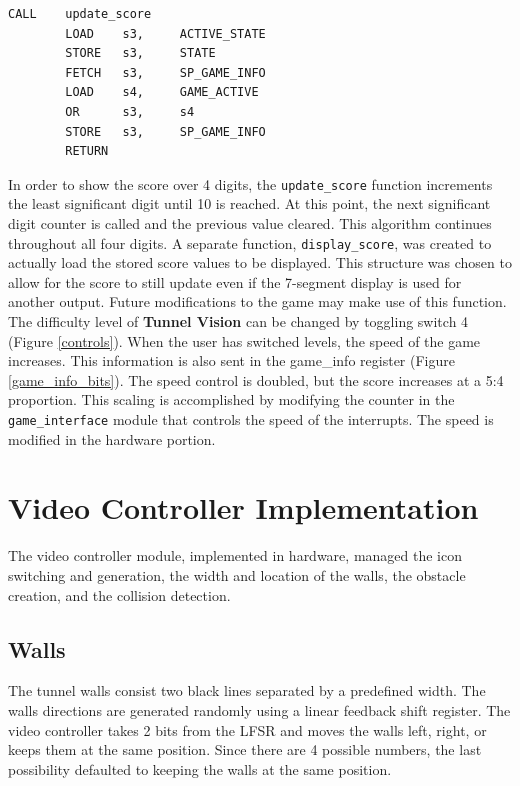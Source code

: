 \documentclass[11pt]{article}
\begin{document}
\vspace{12pt}

\begin{lstlisting}[caption=Update the state game info, label=active]		
		CALL	update_score				
		LOAD 	s3,		ACTIVE_STATE
		STORE	s3,		STATE
		FETCH	s3,		SP_GAME_INFO
		LOAD 	s4,		GAME_ACTIVE
		OR		s3,		s4					
		STORE	s3,		SP_GAME_INFO
		RETURN
 \end{lstlisting}


\hspace{16pt}In order to show the score over 4 digits, the \texttt{update\_score} function increments the least significant digit until 10 is reached.  At this point, the next significant digit counter is called and the previous value cleared.  This algorithm continues throughout all four digits. A separate function, \texttt{display\_score}, was created to actually load the stored score values to be displayed.  This structure was chosen to allow for the score to still update even if the 7-segment display is used for another output.  Future modifications to the game may make use of this function.\\		

\hspace{16pt} The difficulty level of \textbf{Tunnel Vision} can be changed by toggling switch 4 (Figure \ref{controls}). When the user has switched levels, the speed of the game increases.  This information is also sent in the game\_info register (Figure \ref{game_info_bits}).  The speed control is doubled, but the score increases at a 5:4 proportion.  This scaling is accomplished by modifying the counter in the \texttt{game\_interface} module that controls the speed of the interrupts. The speed is modified in the hardware portion.\\

	
\section{Video Controller Implementation}
	The video controller module, implemented in hardware, managed the icon switching and generation, the width and location of the walls, the obstacle creation, and the collision detection.
	
	


\subsection{Walls}
The tunnel walls consist two black lines separated by a predefined width.  The walls directions are generated randomly using a linear feedback shift register. The video controller takes 2 bits from the LFSR and moves the walls left, right, or keeps them at the same position.  Since there are 4 possible numbers, the last possibility defaulted to keeping the walls at the same position.  \\
\end{document}
